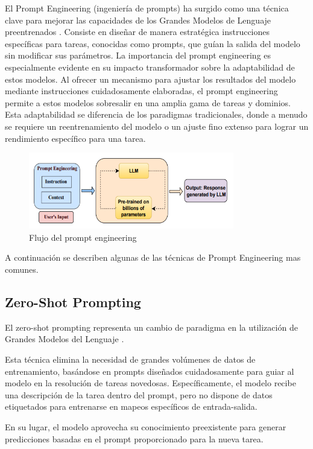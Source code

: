 El Prompt Engineering (ingeniería de prompts) ha surgido como una técnica clave para mejorar las capacidades de los Grandes Modelos de Lenguaje preentrenados \cite{sahoo2025systematicsurveypromptengineering}. 
Consiste en diseñar de manera estratégica instrucciones específicas para tareas, conocidas como prompts, que guían la salida del modelo sin modificar sus parámetros. 
La importancia del prompt engineering es especialmente evidente en su impacto transformador sobre la adaptabilidad de estos modelos. 
Al ofrecer un mecanismo para ajustar los resultados del modelo mediante instrucciones cuidadosamente elaboradas, el prompt engineering permite a estos modelos sobresalir en una amplia gama de tareas y dominios. 
Esta adaptabilidad se diferencia de los paradigmas tradicionales, donde a menudo se requiere un reentrenamiento del modelo o un ajuste fino extenso para lograr un rendimiento específico para una tarea.

\begin{figure}[h]
	\centering
	\includegraphics[width=0.8\textwidth]{figs/prompt_engineering.png}
	\caption{Flujo del prompt engineering}
	\label{fig:context-anoni1}
\end{figure}


A continuación se describen algunas de las técnicas de Prompt Engineering mas comunes.

\subsection{Zero-Shot Prompting}
El zero-shot prompting representa un cambio de paradigma en la utilización de Grandes Modelos del Lenguaje \cite{radford2019}. 

Esta técnica elimina la necesidad de grandes volúmenes de datos de entrenamiento, basándose en prompts diseñados cuidadosamente para guiar al modelo en la resolución de tareas novedosas. 
Específicamente, el modelo recibe una descripción de la tarea dentro del prompt, pero no dispone de datos etiquetados para entrenarse en mapeos específicos de entrada-salida. 

En su lugar, el modelo aprovecha su conocimiento preexistente para generar predicciones basadas en el prompt proporcionado para la nueva tarea.

